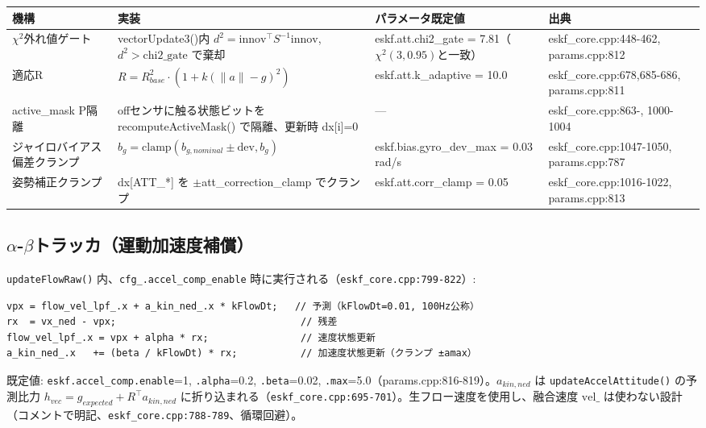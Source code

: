 \documentclass[a4paper,10pt]{ltjsarticle}
\begin{document}
\begin{table}[h]
\centering\footnotesize
\begin{tabularx}{\textwidth}{@{}lYlY@{}}
\toprule
機構 & 実装 & パラメータ既定値 & 出典 \\
\midrule
$\chi^2$外れ値ゲート & vectorUpdate3()内 $d^2 = \mathrm{innov}^\top S^{-1} \mathrm{innov}$, $d^2 > \mathrm{chi2\_gate}$ で棄却 & eskf.att.chi2\_gate = 7.81（$\chi^2(3,0.95)$と一致） & eskf\_core.cpp:448-462, params.cpp:812 \\
適応R & $R = R_{base}^2 \cdot (1+k(\|a\|-g)^2)$ & eskf.att.k\_adaptive = 10.0 & eskf\_core.cpp:678,685-686, params.cpp:811 \\
active\_mask P隔離 & offセンサに触る状態ビットを recomputeActiveMask() で隔離、更新時 dx[i]=0 & --- & eskf\_core.cpp:863-, 1000-1004 \\
ジャイロバイアス偏差クランプ & $b_g = \mathrm{clamp}(b_{g,nominal} \pm \mathrm{dev}, b_g)$ & eskf.bias.gyro\_dev\_max = 0.03\,rad/s & eskf\_core.cpp:1047-1050, params.cpp:787 \\
姿勢補正クランプ & dx[ATT\_*] を $\pm$att\_correction\_clamp でクランプ & eskf.att.corr\_clamp = 0.05 & eskf\_core.cpp:1016-1022, params.cpp:813 \\
\bottomrule
\end{tabularx}
\end{table}

\subsection{$\alpha$-$\beta$トラッカ（運動加速度補償）}

\texttt{updateFlowRaw()} 内、\texttt{cfg\_.accel\_comp\_enable} 時に実行される（\texttt{eskf\_core.cpp:799-822}）:

\begin{verbatim}
vpx = flow_vel_lpf_.x + a_kin_ned_.x * kFlowDt;   // 予測（kFlowDt=0.01, 100Hz公称）
rx  = vx_ned - vpx;                                // 残差
flow_vel_lpf_.x = vpx + alpha * rx;                // 速度状態更新
a_kin_ned_.x   += (beta / kFlowDt) * rx;           // 加速度状態更新（クランプ ±amax）
\end{verbatim}

既定値: \texttt{eskf.accel\_comp.enable}=1, \texttt{.alpha}=0.2, \texttt{.beta}=0.02, \texttt{.max}=5.0（params.cpp:816-819）。$a_{kin,ned}$ は \texttt{updateAccelAttitude()} の予測比力 $h_{vec} = g_{expected} + R^\top a_{kin,ned}$ に折り込まれる（\texttt{eskf\_core.cpp:695-701}）。生フロー速度を使用し、融合速度 $\mathrm{vel\_}$ は使わない設計（コメントで明記、\texttt{eskf\_core.cpp:788-789}、循環回避）。
\end{document}
